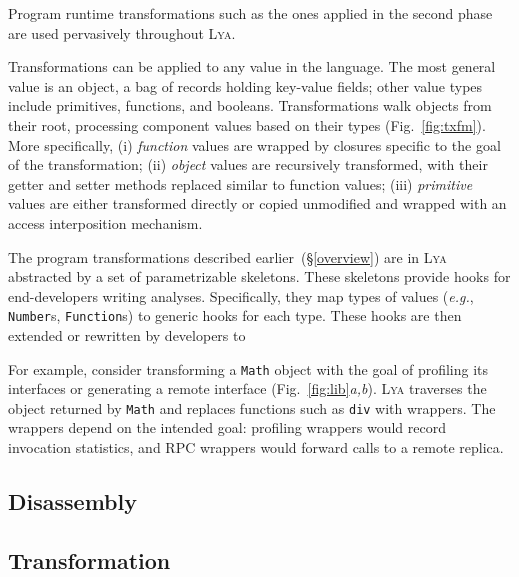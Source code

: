 \documentclass[letterpaper,twocolumn,10pt]{article}
\def\eg{{\em e.g.}, }
\newcommand{\ttt}[1]{\texttt{#1}}
\newcommand{\sx}[1]{(\S\ref{#1})}
\newcommand{\sys}{{\scshape Lya}\xspace}
\begin{document}
Program runtime transformations such as the ones applied in the second phase are used pervasively throughout \sys.

Transformations can be applied to any value in the language. 
The most general value is an object, a bag of records holding key-value fields;
  other value types include primitives, functions, and booleans.
Transformations walk objects from their root, processing component values based on their types (Fig.~\ref{fig:txfm}).
More specifically,
  (i) \emph{function} values are wrapped by closures specific to the goal of the transformation; %
  (ii) \emph{object} values are recursively transformed, with their getter and setter methods replaced similar to function values; %
  (iii) \emph{primitive} values are either transformed directly or copied unmodified and wrapped with an access interposition mechanism.

The program transformations described earlier~\sx{overview} are in \sys  abstracted by a set of parametrizable skeletons.
These skeletons provide hooks for end-developers writing analyses.
Specifically, they map types of values (\eg \ttt{Number}s, \ttt{Function}s) to generic hooks for each type. 
These hooks are then extended or rewritten by developers to

For example, consider transforming a \ttt{Math} object with the goal of profiling its interfaces or generating a remote interface (Fig.~\ref{fig:lib}\emph{a,b}).
\sys traverses the object returned by \ttt{Math} and replaces functions such as \ttt{div} with wrappers.
The wrappers depend on the intended goal:
  profiling wrappers would record invocation statistics, and RPC wrappers would forward calls to a remote replica.


\subsection{Disassembly}
\label{one}

\subsection{Transformation}
\label{two}
\end{document}
